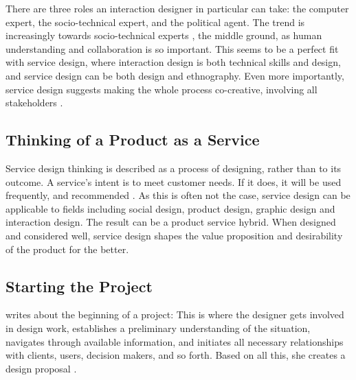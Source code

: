 There are three roles an interaction designer in particular can take: the computer expert, the socio-technical expert, and the political agent. The trend is increasingly towards socio-technical experts \citep{lowgren}, the middle ground, as human understanding and collaboration is so important. This seems to be a perfect fit with service design, where interaction design is both technical skills and design, and service design can be both design and ethnography. Even more importantly, service design suggests making the whole process co-creative, involving all stakeholders \citep{stickdorn}.

\subsection{Thinking of a Product as a Service}

Service design thinking is described as a process of designing, rather than to its outcome. A service's intent is to meet customer needs. If it does, it will be used frequently, and recommended \citep{stickdorn}. As this is often not the case, service design can be applicable to fields including social design, product design, graphic design and interaction design. The result can be a product service hybrid. When designed and considered well, service design shapes the value proposition and desirability of the product for the better.

\subsection{Starting the Project}

\cite{lowgren} writes about the beginning of a project: This is where the designer gets involved in design work, establishes a preliminary understanding of the situation, navigates through available information, and initiates all necessary relationships with clients, users, decision makers, and so forth. Based on all this, she creates a design proposal \citep{lowgren}.
